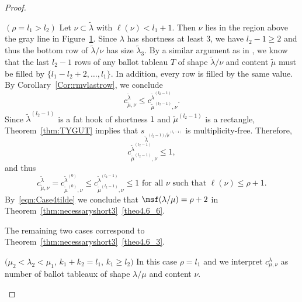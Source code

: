 \begin{proof}
\begin{Case}
\begin{figure}[b]
 \caption[Case 2.2]{}
 \label{Case4.2}
\end{figure}

\end{Case}

\begin{Case}
{ $(\rho=l_1>l_2)$} 
Let $\nu \subset \tilde\lambda$ with $\ell(\nu) < l_1 + 1$. Then $\nu$ lies in the region above the gray line in Figure~\ref{Case4.2}. Since $\lambda$ has shortness at least $3$, we have $l_2-1\geq 2$ and thus the bottom row of $\tilde\lambda/\nu$ has size $\tilde\lambda_3$. By a similar argument as in , we know that the last $l_2-1$ rows of any ballot tableau $T$ of shape $\tilde \lambda/\nu$ and content $\tilde\mu$ must be filled by $\{l_1-l_2+2,\ldots,l_1\}$. In addition, every row is filled by the same value. By Corollary~\ref{Cor:rmvlastrow}, we conclude 
\[
c^{\tilde\lambda}_{\tilde\mu,\nu}\leq c^{\tilde \lambda^{(l_2-1)}}_{\tilde \mu^{(l_2-1)},\nu}.
\]
Since $\tilde \lambda^{(l_2-1)}$ is a fat hook of shortness $1$ and $\tilde \mu^{(l_2-1)}$ is a rectangle, Theorem~\ref{thm:TYGUT} implies that $s_{\tilde \lambda^{(l_2-1)/\tilde \mu^{(l_2-1)}}}$ is multiplicity-free. Therefore,
\[
c^{\tilde \lambda^{(l_2-1)}}_{\tilde \mu^{(l_2-1)},\nu} \leq 1,
\]
and thus
\[
c^{\tilde\lambda}_{\tilde\mu,\nu} = c^{\tilde \lambda^{(0)}}_{\tilde \mu^{(0)},\nu}\leq c^{\tilde \lambda^{(l_2-1)}}_{\tilde \mu^{(l_2-1)},\nu} \leq 1 \text{ for all }\nu\text{ such that }\ell(\nu)\leq \rho+1.
\]
By~\eqref{eqn:Case4tilde} we conclude that ${\msf }(\lambda/\mu) = \rho+2$ in Theorem~\ref{thm:necessaryshort3}~\ref{theo4.6_6}.


The remaining two cases correspond to Theorem~\ref{thm:necessaryshort3}~\ref{theo4.6_3}.
\end{Case}

\begin{Case}
{ $(\mu_2<\lambda_2<\mu_1$, $k_1+k_2=l_1$, $k_1\geq l_2)$} 
In this case $\rho = l_1$ and we interpret $c^{\lambda}_{\mu,\nu}$ as number of ballot tableaux of shape $\lambda/\mu$ and content $\nu$.


\end{Case}
\end{proof}
